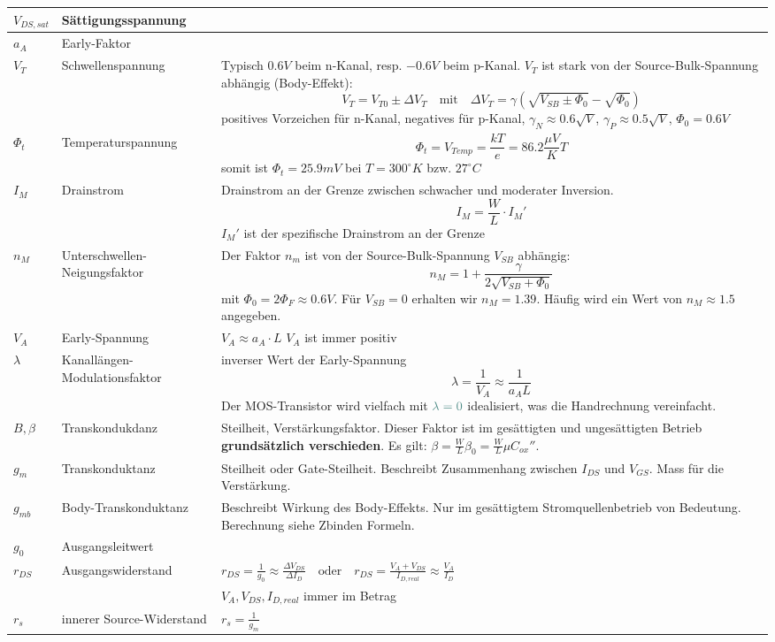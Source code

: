 \begin{longtable}{|l|l|p{11cm}|}
	\hline
		$V_{DS,sat}$	& Sättigungsspannung	&
	\\ \hline
		$a_A$			& Early-Faktor			&
	\\ \hline
		$V_T$ & Schwellenspannung &
		Typisch $0.6V$ beim n-Kanal, resp. $-0.6V$ beim p-Kanal. $V_T$ ist stark von der Source-Bulk-Spannung abhängig (Body-Effekt):
		\[ 
			V_T = V_{T0} \pm \Delta V_T \quad \text{mit} \quad \Delta V_T = \gamma(\sqrt{V_{SB} \pm \Phi_0} -\sqrt{\Phi_0})
		\]
		positives Vorzeichen für n-Kanal, negatives für p-Kanal, $\gamma_N \approx 0.6\sqrt{V}$, $\gamma_P \approx 0.5\sqrt{V}$, $\Phi_{0} = 0.6V$ 
	\\ \hline
		$\Phi_t$ & Temperaturspannung &
		\[
			\Phi_t = V_{Temp} = \frac{kT}{e} = 86.2 \frac{\mu V}{K}T
		\]
		somit ist $\Phi_t = 25.9mV$ bei $T=300^\circ K$ bzw. $27^\circ C$
	\\ \hline
		$I_M$ & Drainstrom &
		Drainstrom an der Grenze zwischen schwacher und moderater Inversion.
		\[
			I_M = \frac{W}{L} \cdot I_M'
		\]
		$I_M'$ ist der spezifische Drainstrom an der Grenze
	\\ \hline
		$n_M$ & Unterschwellen-Neigungsfaktor &
		Der Faktor $n_m$ ist von der Source-Bulk-Spannung $V_{SB}$ abhängig:
		\[
			n_M = 1 + \frac{\gamma}{2 \sqrt{V_{SB} + \Phi_0}}
		\]
		mit $\Phi_0 = 2 \Phi_F \approx 0.6V$. 
		Für $V_{SB} = 0$ erhalten wir $n_M=1.39$. Häufig wird ein Wert von $n_M \approx 1.5$ angegeben.
	\\ \hline
		$V_A$			& Early-Spannung		& $V_A \approx a_A \cdot L$ \quad $V_{A}$ ist immer positiv
	\\ \hline
		$\lambda$ & Kanallängen-Modulationsfaktor &
		inverser Wert der Early-Spannung
		\[
			\lambda = \frac{1}{V_A} \approx \frac{1}{a_A L}
		\]
		Der MOS-Transistor wird vielfach mit $\textcolor{HSRLakeGreen}{\lambda = 0}$ idealisiert, was die Handrechnung vereinfacht.
	\\ \hline
		$B, \beta$ & Transkondukdanz &
		Steilheit, Verstärkungsfaktor. Dieser Faktor ist im gesättigten und ungesättigten Betrieb \textbf{grundsätzlich verschieden}. Es gilt: $\beta = \frac{W}{L} \beta_0 = \frac{W}{L} \mu C_{ox}''$. 
	\\ \hline
		$g_{m}$	& Transkonduktanz & Steilheit oder Gate-Steilheit. Beschreibt Zusammenhang zwischen $I_{DS}$ und $V_{GS}$. Mass für die Verstärkung.
	\\ \hline
		$g_{mb}$ & Body-Transkonduktanz & Beschreibt Wirkung des Body-Effekts. Nur im gesättigtem Stromquellenbetrieb von Bedeutung. Berechnung siehe Zbinden Formeln.
	\\ \hline
		$g_{0}$ & Ausgangsleitwert &
	\\ \hline
		$r_{DS}$ & Ausgangswiderstand & $r_{DS} = \frac{1}{g_0} \approx \frac{\Delta 	V_{DS}}{\Delta I_D} \quad 
													  \text{oder} \quad r_{DS} = \frac{V_A + V_{DS}}{I_{D,real}} \approx \frac{V_A}{I_D} $ 
	\\				&			&$V_{A}, V_{DS}, I_{D,real}$ immer im Betrag  
	\\ \hline
		$r_{s}$	& innerer Source-Widerstand & $r_{s} = \frac{1}{g_{m}}$
	\\ \hline
\end{longtable}
